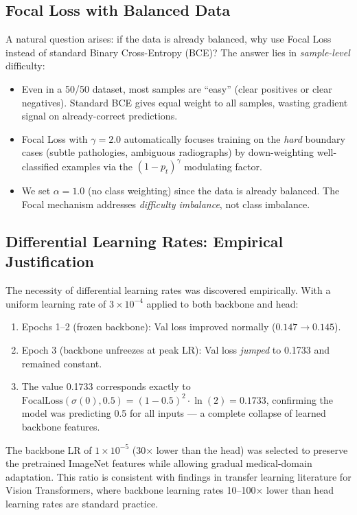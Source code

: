 \documentclass[12pt,a4paper]{report}
\begin{document}
\subsection{Focal Loss with Balanced Data}

A natural question arises: if the data is already balanced, why use Focal Loss instead of standard Binary Cross-Entropy (BCE)? The answer lies in \textit{sample-level} difficulty:

\begin{itemize}
    \item Even in a 50/50 dataset, most samples are ``easy'' (clear positives or clear negatives). Standard BCE gives equal weight to all samples, wasting gradient signal on already-correct predictions.
    \item Focal Loss with $\gamma = 2.0$ automatically focuses training on the \textit{hard} boundary cases (subtle pathologies, ambiguous radiographs) by down-weighting well-classified examples via the $(1 - p_t)^\gamma$ modulating factor.
    \item We set $\alpha = 1.0$ (no class weighting) since the data is already balanced. The Focal mechanism addresses \textit{difficulty imbalance}, not class imbalance.
\end{itemize}

\subsection{Differential Learning Rates: Empirical Justification}

The necessity of differential learning rates was discovered empirically. With a uniform learning rate of $3 \times 10^{-4}$ applied to both backbone and head:

\begin{enumerate}
    \item Epochs 1--2 (frozen backbone): Val loss improved normally ($0.147 \rightarrow 0.145$).
    \item Epoch 3 (backbone unfreezes at peak LR): Val loss \textit{jumped} to 0.1733 and remained constant.
    \item The value 0.1733 corresponds exactly to $\text{FocalLoss}(\sigma(0), 0.5) = (1 - 0.5)^2 \cdot \ln(2) = 0.1733$, confirming the model was predicting 0.5 for all inputs --- a complete collapse of learned backbone features.
\end{enumerate}

The backbone LR of $1 \times 10^{-5}$ (30$\times$ lower than the head) was selected to preserve the pretrained ImageNet features while allowing gradual medical-domain adaptation. This ratio is consistent with findings in transfer learning literature for Vision Transformers, where backbone learning rates 10--100$\times$ lower than head learning rates are standard practice.
\end{document}
